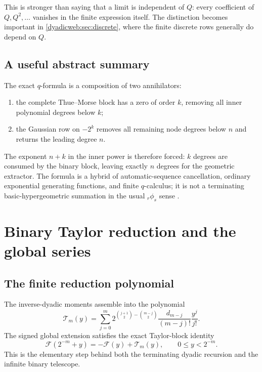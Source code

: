 \documentclass[11pt,oneside]{article}
\theoremstyle{definition}
\theoremstyle{remark}
\begin{document}
This is stronger than saying that a limit is independent of $Q$: every coefficient of
$Q,Q^2,\ldots$ vanishes in the finite expression itself.  The distinction becomes important
in \cref{dyadicweb:sec:discrete}, where the finite discrete rows generally do depend on $Q$.

\subsection{A useful abstract summary}

The exact $q$-formula is a composition of two annihilators:
\begin{enumerate}
\item the complete Thue--Morse block has a zero of order $k$, removing all inner polynomial
      degrees below $k$;
\item the Gaussian row on $-2^k$ removes all remaining node degrees below $n$ and returns the
      leading degree $n$.
\end{enumerate}
The exponent $n+k$ in the inner power is therefore forced: $k$ degrees are consumed by the
binary block, leaving exactly $n$ degrees for the geometric extractor.  The formula is a
hybrid of automatic-sequence cancellation, ordinary exponential generating functions, and
finite $q$-calculus; it is not a terminating basic-hypergeometric summation in the usual
${}_r\phi_s$ sense \cite{dyadicweb:gasper2004,dyadicweb:dlmf17}.

\section{Binary Taylor reduction and the global series}
\label{dyadicweb:sec:binary}

\subsection{The finite reduction polynomial}

The inverse-dyadic moments assemble into the polynomial
\begin{equation}
 \mathcal T_m(y)=
 \sum_{j=0}^{m}
 2^{\binom{j+1}{2}-\binom{m-j}{2}}
 \frac{d_{m-j}}{(m-j)!}\frac{y^j}{j!}.                    \label{dyadicweb:eq:T-def-local}
\end{equation}
The signed global extension satisfies the exact Taylor-block identity
\begin{equation}
 \mathcal F(2^{-m}+y)=-\mathcal F(y)+\mathcal T_m(y),
 \qquad 0\le y<2^{-m}.                                    \label{dyadicweb:eq:T-reduction-local}
\end{equation}
This is the elementary step behind both the terminating dyadic recursion and the infinite
binary telescope.
\end{document}

